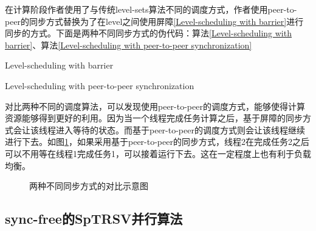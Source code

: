 在计算阶段作者使用了与传统level-sets算法不同的调度方式，作者使用peer-to-peer的同步方式替换为了在level之间使用屏障\ref{Level-scheduling with barrier}进行同步的方式。下面是两种不同同步方式的伪代码：算法\ref{Level-scheduling with barrier}、算法\ref{Level-scheduling with peer-to-peer synchronization}

\begin{algorithm}
    \caption{Level-scheduling with barrier}
    \label{Level-scheduling with barrier}
\end{algorithm}
\begin{algorithm}
    \caption{Level-scheduling with peer-to-peer synchronization}
    \label{Level-scheduling with peer-to-peer synchronization}
\end{algorithm}

对比两种不同的调度算法，可以发现使用peer-to-peer的调度方式，能够使得计算资源能够得到更好的利用。因为当一个线程完成任务计算之后，基于屏障的同步方式会让该线程进入等待的状态。而基于peer-to-peer的调度方式则会让该线程继续进行下去。如图\ref{两种不同同步方式的对比示意图}，如果采用基于peer-to-peer的同步方式，线程2在完成任务2之后可以不用等在线程1完成任务1，可以接着运行下去。这在一定程度上也有利于负载均衡。

\begin{figure}[htbp]
    \centering
    \centering
    \caption{两种不同同步方式的对比示意图}
    \label{两种不同同步方式的对比示意图}
\end{figure}

\subsection{sync-free的SpTRSV并行算法}

